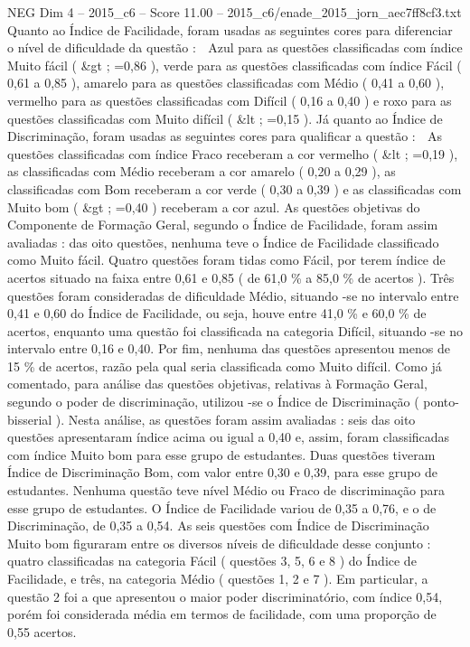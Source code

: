 \begin{textsample}{NEG Dim 4 – 2015\_c6 – Score 11.00 – 2015\_c6/enade\_2015\_jorn\_aec7ff8cf3.txt}
Quanto ao Índice de Facilidade, foram usadas as seguintes cores para diferenciar o nível de dificuldade da questão :  Azul para as questões classificadas com índice Muito fácil ( \&gt ; =0,86 ), verde para as questões classificadas com índice Fácil ( 0,61 a 0,85 ), amarelo para as questões classificadas com Médio ( 0,41 a 0,60 ), vermelho para as questões classificadas com Difícil ( 0,16 a 0,40 ) e roxo para as questões classificadas com Muito difícil ( \&lt ; =0,15 ).
Já quanto ao Índice de Discriminação, foram usadas as seguintes cores para qualificar a questão :  As questões classificadas com índice Fraco receberam a cor vermelho ( \&lt ; =0,19 ), as classificadas com Médio receberam a cor amarelo ( 0,20 a 0,29 ), as classificadas com Bom receberam a cor verde ( 0,30 a 0,39 ) e as classificadas com Muito bom ( \&gt ; =0,40 ) receberam a cor azul.
As questões objetivas do Componente de Formação Geral, segundo o Índice de Facilidade, foram assim avaliadas : das oito questões, nenhuma teve o Índice de Facilidade classificado como Muito fácil.
Quatro questões foram tidas como Fácil, por terem índice de acertos situado na faixa entre 0,61 e 0,85 ( de 61,0 \% a 85,0 \% de acertos ).
Três questões foram consideradas de dificuldade Médio, situando -se no intervalo entre 0,41 e 0,60 do Índice de Facilidade, ou seja, houve entre 41,0 \% e 60,0 \% de acertos, enquanto uma questão foi classificada na categoria Difícil, situando -se no intervalo entre 0,16 e 0,40.
Por fim, nenhuma das questões apresentou menos de 15 \% de acertos, razão pela qual seria classificada como Muito difícil.
Como já comentado, para análise das questões objetivas, relativas à Formação Geral, segundo o poder de discriminação, utilizou -se o Índice de Discriminação ( ponto- bisserial ).
Nesta análise, as questões foram assim avaliadas : seis das oito questões apresentaram índice acima ou igual a 0,40 e, assim, foram classificadas com índice Muito bom para esse grupo de estudantes.
Duas questões tiveram Índice de Discriminação Bom, com valor entre 0,30 e 0,39, para esse grupo de estudantes.
Nenhuma questão teve nível Médio ou Fraco de discriminação para esse grupo de estudantes.
O Índice de Facilidade variou de 0,35 a 0,76, e o de Discriminação, de 0,35 a 0,54.
As seis questões com Índice de Discriminação Muito bom figuraram entre os diversos níveis de dificuldade desse conjunto : quatro classificadas na categoria Fácil ( questões 3, 5, 6 e 8 ) do Índice de Facilidade, e três, na categoria Médio ( questões 1, 2 e 7 ).
Em particular, a questão 2 foi a que apresentou o maior poder discriminatório, com índice 0,54, porém foi considerada média em termos de facilidade, com uma proporção de 0,55 acertos.

\end{textsample}
